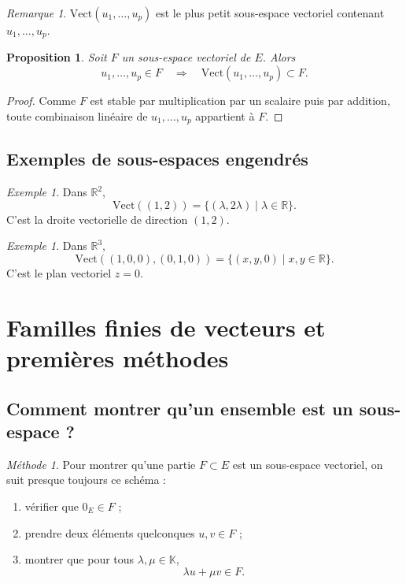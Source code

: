 \documentclass[11pt,a4paper]{article}
\newtheorem{proposition}[definition]{Proposition}
\theoremstyle{remark}
\newtheorem{remarque}[definition]{Remarque}
\newtheorem{exemple}[definition]{Exemple}
\newtheorem*{methode}{Méthode}
\newcommand{\R}{\mathbb{R}}
\newcommand{\K}{\mathbb{K}}
\begin{document}
\begin{remarque}
\(\mathrm{Vect}(u_1,\dots,u_p)\) est le plus petit sous-espace vectoriel contenant \(u_1,\dots,u_p\).
\end{remarque}

\begin{proposition}
Soit \(F\) un sous-espace vectoriel de \(E\).  
Alors
\[
u_1,\dots,u_p\in F
\quad \Longrightarrow \quad
\mathrm{Vect}(u_1,\dots,u_p)\subset F.
\]
\end{proposition}

\begin{proof}
Comme \(F\) est stable par multiplication par un scalaire puis par addition, toute combinaison linéaire de \(u_1,\dots,u_p\) appartient à \(F\).
\end{proof}

\subsection{Exemples de sous-espaces engendrés}

\begin{exemple}
Dans \(\R^2\),
\[
\mathrm{Vect}((1,2))
=
\{(\lambda,2\lambda)\mid \lambda\in\R\}.
\]
C’est la droite vectorielle de direction \((1,2)\).
\end{exemple}

\begin{exemple}
Dans \(\R^3\),
\[
\mathrm{Vect}((1,0,0),(0,1,0))
=
\{(x,y,0)\mid x,y\in\R\}.
\]
C’est le plan vectoriel \(z=0\).
\end{exemple}

\section{Familles finies de vecteurs et premières méthodes}

\subsection{Comment montrer qu’un ensemble est un sous-espace ?}

\begin{methode}
Pour montrer qu’une partie \(F\subset E\) est un sous-espace vectoriel, on suit presque toujours ce schéma :
\begin{enumerate}
    \item vérifier que \(0_E\in F\) ;
    \item prendre deux éléments quelconques \(u,v\in F\) ;
    \item montrer que pour tous \(\lambda,\mu\in\K\),
    \[
    \lambda u+\mu v\in F.
    \]
\end{enumerate}
\end{methode}
\end{document}
